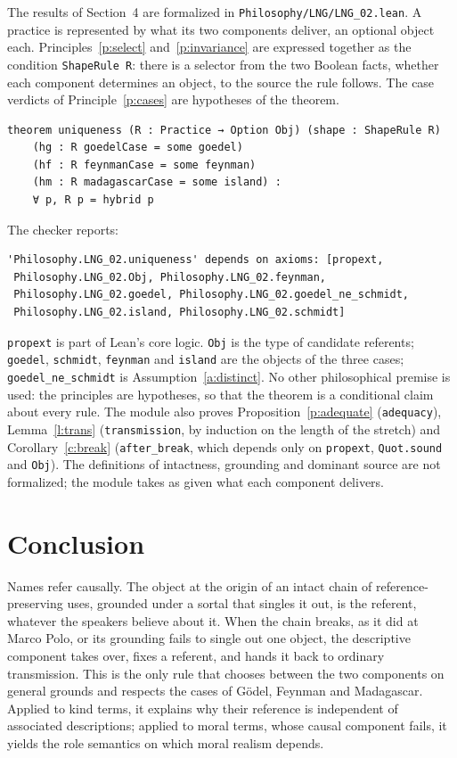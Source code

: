 \documentclass{situationist-preprint}
\begin{document}
The results of Section~4 are formalized in \nolinkurl{Philosophy/LNG/LNG_02.lean}. A practice is represented by what its two components deliver, an optional object each. Principles~\ref{p:select} and~\ref{p:invariance} are expressed together as the condition \lstinline{ShapeRule R}: there is a selector from the two Boolean facts, whether each component determines an object, to the source the rule follows. The case verdicts of Principle~\ref{p:cases} are hypotheses of the theorem.

\begin{lstlisting}
theorem uniqueness (R : Practice → Option Obj) (shape : ShapeRule R)
    (hg : R goedelCase = some goedel)
    (hf : R feynmanCase = some feynman)
    (hm : R madagascarCase = some island) :
    ∀ p, R p = hybrid p
\end{lstlisting}

The checker reports:

\begin{lstlisting}
'Philosophy.LNG_02.uniqueness' depends on axioms: [propext,
 Philosophy.LNG_02.Obj, Philosophy.LNG_02.feynman,
 Philosophy.LNG_02.goedel, Philosophy.LNG_02.goedel_ne_schmidt,
 Philosophy.LNG_02.island, Philosophy.LNG_02.schmidt]
\end{lstlisting}

\lstinline{propext} is part of Lean's core logic. \lstinline{Obj} is the type of candidate referents; \lstinline{goedel}, \lstinline{schmidt}, \lstinline{feynman} and \lstinline{island} are the objects of the three cases; \lstinline{goedel_ne_schmidt} is Assumption~\ref{a:distinct}. No other philosophical premise is used: the principles are hypotheses, so that the theorem is a conditional claim about every rule. The module also proves Proposition~\ref{p:adequate} (\lstinline{adequacy}), Lemma~\ref{l:trans} (\lstinline{transmission}, by induction on the length of the stretch) and Corollary~\ref{c:break} (\lstinline{after_break}, which depends only on \lstinline{propext}, \lstinline{Quot.sound} and \lstinline{Obj}). The definitions of intactness, grounding and dominant source are not formalized; the module takes as given what each component delivers.

\section{Conclusion}

Names refer causally. The object at the origin of an intact chain of reference-preserving uses, grounded under a sortal that singles it out, is the referent, whatever the speakers believe about it. When the chain breaks, as it did at Marco Polo, or its grounding fails to single out one object, the descriptive component takes over, fixes a referent, and hands it back to ordinary transmission. This is the only rule that chooses between the two components on general grounds and respects the cases of G\"odel, Feynman and Madagascar. Applied to kind terms, it explains why their reference is independent of associated descriptions; applied to moral terms, whose causal component fails, it yields the role semantics on which moral realism depends.
\end{document}
